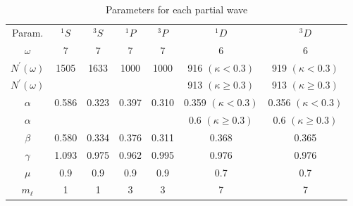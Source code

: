 \documentclass[preprint,showpacs,showkeys,preprintnumbers,amsmath,amssymb,longbibliography,pra,aps]{revtex4-1}
\begin{document}
\begin{table}[H]
  \centering
	\begin{ruledtabular}
    \begin{tabular}{ccccccc}
    Param. & $^1S$ & $^3S$ & $^1P$ & $^3P$ & $^1D$ & $^3D$ \\
    \colrule
	$\omega$           & 7     & 7     & 7     & 7     & 6     & 6      \\
	$N^\prime(\omega)$ & 1505  & 1633  & 1000  & 1000  & 916 $(\kappa < 0.3)$   & 919 $(\kappa < 0.3)$ \\
	$N^\prime(\omega)$ &   &   &   &   & 913 $(\kappa \geq 0.3)$   & 913 $(\kappa \geq 0.3)$  \\
	$\alpha$           & 0.586 & 0.323 & 0.397 & 0.310 & 0.359 $(\kappa < 0.3)$ & 0.356 $(\kappa < 0.3)$  \\
	$\alpha$    &  &  &  &  & 0.6 $(\kappa \geq 0.3)$ & 0.6 $(\kappa \geq 0.3)$ \\
	$\beta$            & 0.580 & 0.334 & 0.376 & 0.311 & 0.368 & 0.365  \\
	$\gamma$           & 1.093 & 0.975 & 0.962 & 0.995 & 0.976 & 0.976  \\
	$\mu$              & 0.9   & 0.9   & 0.9   & 0.9   & 0.7   & 0.7  \\
	$m_\ell$           & 1     & 1     & 3     & 3     & 7     & 7     \\
    \end{tabular}
  \end{ruledtabular}
  \caption{Parameters for each partial wave}
  \label{tab:Nonlinear1}
\end{table}
\end{document}
